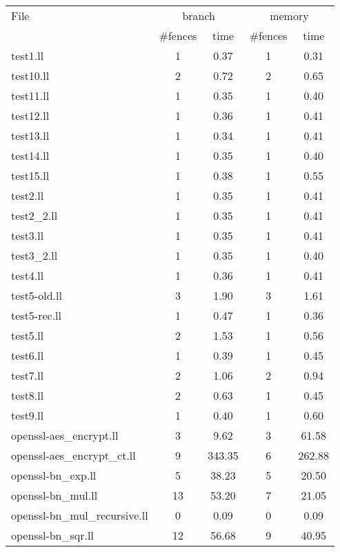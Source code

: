 \begin{tabular}{l|c|c|c|c|}
\toprule
File & \multicolumn{2}{c|}{branch} & \multicolumn{2}{c|}{memory} \\
& \#fences & time & \#fences & time\\
\midrule
test1.ll & 1 & 0.37 & 1 & 0.31\\
test10.ll & 2 & 0.72 & 2 & 0.65\\
test11.ll & 1 & 0.35 & 1 & 0.40\\
test12.ll & 1 & 0.36 & 1 & 0.41\\
test13.ll & 1 & 0.34 & 1 & 0.41\\
test14.ll & 1 & 0.35 & 1 & 0.40\\
test15.ll & 1 & 0.38 & 1 & 0.55\\
test2.ll & 1 & 0.35 & 1 & 0.41\\
test2\_2.ll & 1 & 0.35 & 1 & 0.41\\
test3.ll & 1 & 0.35 & 1 & 0.41\\
test3\_2.ll & 1 & 0.35 & 1 & 0.40\\
test4.ll & 1 & 0.36 & 1 & 0.41\\
test5-old.ll & 3 & 1.90 & 3 & 1.61\\
test5-rec.ll & 1 & 0.47 & 1 & 0.36\\
test5.ll & 2 & 1.53 & 1 & 0.56\\
test6.ll & 1 & 0.39 & 1 & 0.45\\
test7.ll & 2 & 1.06 & 2 & 0.94\\
test8.ll & 2 & 0.63 & 1 & 0.45\\
test9.ll & 1 & 0.40 & 1 & 0.60\\
\midrule
openssl-aes\_encrypt.ll & 3 & 9.62 & 3 & 61.58\\
openssl-aes\_encrypt\_ct.ll & 9 & 343.35 & 6 & 262.88\\
openssl-bn\_exp.ll & 5 & 38.23 & 5 & 20.50\\
openssl-bn\_mul.ll & 13 & 53.20 & 7 & 21.05\\
openssl-bn\_mul\_recursive.ll & 0 & 0.09 & 0 & 0.09\\
openssl-bn\_sqr.ll & 12 & 56.68 & 9 & 40.95\\
\bottomrule
\end{tabular}
